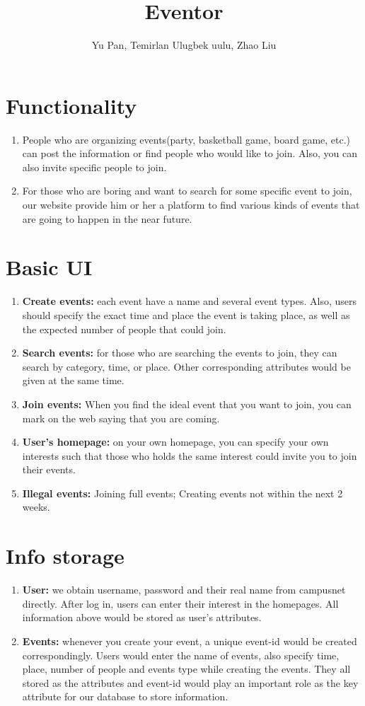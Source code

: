 \documentclass{article}
\author{Yu Pan, Temirlan Ulugbek uulu, Zhao Liu}
\title{Eventor}
\begin{document}
	\maketitle
	\section*{Functionality}
	\begin{enumerate}
		\item People who are organizing events(party, basketball game, board game, etc.) can post the information or find people who would like to join. Also, you can also invite specific people to join.
		\item For those who are boring and want to search for some specific event to join, our website provide him or her a platform to find various kinds of events that are going to happen in the near future.
	\end{enumerate}
	\section*{Basic UI}
	\begin{enumerate}
		\item \textbf{Create events:} each event have a name and several event types. Also, users should specify the exact time and  place the event is taking place, as well as the expected number of people that could join.
		\item \textbf{Search events:} for those who are searching the events to join, they can search by category, time, or place. Other corresponding attributes would be given at the same time.
		\item \textbf{Join events:} When you find the ideal event that you want to join, you can mark on the web saying that you are coming.
		\item \textbf{User's homepage:} on your own homepage, you can specify your own interests such that those who holds the same interest could invite you to join their events.
		\item \textbf{Illegal events:} Joining full events; Creating events not within the next 2 weeks.
	\end{enumerate}
	\section*{Info storage}
	\begin{enumerate}
		\item \textbf{User:} we obtain username, password and their real name from campusnet directly. After log in, users can enter their interest in the homepages. All information above would be stored as user's attributes.
		\item \textbf{Events:} whenever you create your event, a unique event-id would be created correspondingly. Users would enter the name of events, also specify time, place, number of people and events type while creating the events. They all stored as the attributes and event-id would play an important role as the key attribute for our database to store information.
	\end{enumerate}
\end{document}
